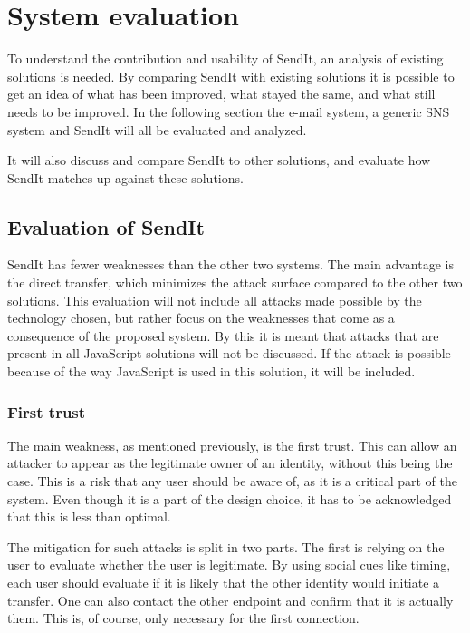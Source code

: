 \chapter{System evaluation} %
%
\label{Chapter7} %
%
To understand the contribution and usability of SendIt, an analysis of existing solutions is needed. By comparing SendIt with existing solutions it is possible to get an idea of what has been improved, what stayed the same, and what still needs to be improved. In the following section the e-mail system, a generic SNS system and SendIt will all be evaluated and analyzed.

 It will also discuss and compare SendIt to other solutions, and evaluate how SendIt matches up against these solutions.
%
\section{Evaluation of SendIt}
%
  SendIt has fewer weaknesses than the other two systems. The main advantage is the direct transfer, which minimizes the attack surface compared to the other two solutions. This evaluation will not include all attacks made possible by the technology chosen, but rather focus on the weaknesses that come as a consequence of the proposed system. By this it is meant that attacks that are present in all JavaScript solutions will not be discussed. If the attack is possible because of the way JavaScript is used in this solution, it will be included.
%
  \subsection{First trust}
  The main weakness, as mentioned previously, is the first trust. This can allow an attacker to appear as the legitimate owner of an identity, without this being the case. This is a risk that any user should be aware of, as it is a critical part of the system. Even though it is a part of the design choice, it has to be acknowledged that this is less than optimal.

  The mitigation for such attacks is split in two parts. The first is relying on the user to evaluate whether the user is legitimate. By using social cues like timing, each user should evaluate if it is likely that the other identity would initiate a transfer. One can also contact the other endpoint and confirm that it is actually them. This is, of course, only necessary for the first connection.

